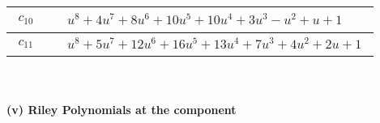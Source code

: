 \documentclass[1p]{elsarticle_modified}
\theoremstyle{definition}
\begin{document}
\begin{tabular}{m{50pt}|m{274pt}}
\hline $$\begin{aligned}c_{10}\end{aligned}$$&$\begin{aligned}
&u^8+4 u^7+8 u^6+10 u^5+10 u^4+3 u^3- u^2+u+1
\end{aligned}$\\
\hline $$\begin{aligned}c_{11}\end{aligned}$$&$\begin{aligned}
&u^8+5 u^7+12 u^6+16 u^5+13 u^4+7 u^3+4 u^2+2 u+1
\end{aligned}$\\
\hline
\end{tabular}\\~\\
\newpage\renewcommand{\arraystretch}{1}
\flushleft \textbf{(v) Riley Polynomials at the component}\newline \\
\end{document}
